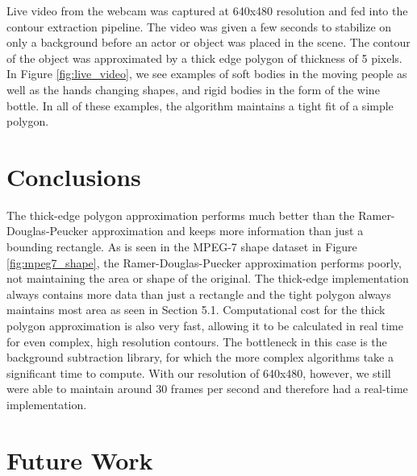 \documentclass[10pt,twocolumn,letterpaper]{article}
\begin{document}
Live video from the webcam was captured at 640x480 resolution and fed into the contour extraction pipeline. The video
was given a few seconds to stabilize on only a background before an actor or object was placed in the scene. The contour
of the object was approximated by a thick edge polygon of thickness of 5 pixels. In Figure \ref{fig:live_video}, we see
examples of soft bodies in the moving people as well as the hands changing shapes, and rigid bodies in the form of the
wine bottle. In all of these examples, the algorithm maintains a tight fit of a simple polygon.


\section{Conclusions}

The thick-edge polygon approximation performs much better than the Ramer-Douglas-Peucker approximation and keeps more
information than just a bounding rectangle. As is seen in the MPEG-7 shape dataset in Figure \ref{fig:mpeg7_shape}, the
Ramer-Douglas-Puecker approximation performs poorly, not maintaining the area or shape of the original. The thick-edge
implementation always contains more data than just a rectangle and the tight polygon always maintains most area as seen
in Section 5.1. Computational cost for the thick polygon approximation is also very fast, allowing it to be calculated
in real time for even complex, high resolution contours. The bottleneck in this case is the background subtraction
library, for which the more complex algorithms take a significant time to compute. With our resolution of 640x480,
however, we still were able to maintain around 30 frames per second and therefore had a real-time implementation.


\section{Future Work}
\end{document}

